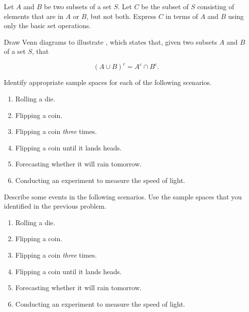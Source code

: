 \documentclass[12pt,reqno]{amsart}
\begin{document}
\bigskip

\prob Let $A$ and $B$ be two subsets of a set $S$. Let $C$ be the subset of $S$ consisting of elements that are in $A$ or $B$, but not both. Express $C$ in terms of $A$ and $B$ using only the basic set operations.
\vspace{2in}

















\prob Draw Venn diagrams to illustrate , which states that, given two subsets $A$ and $B$ of a set $S$, that

	\[(A\cup B)^c = A^c \cap B^c.\]
\vspace{2in}












\prob Identify appropriate sample spaces for each of the following scenarios.

\medskip
\begin{enumerate}
\item Rolling a die.\vfill
\item Flipping a coin.\vfill
\item Flipping a coin \textit{three} times.\vfill
\item Flipping a coin until it lands heads.\vfill
\item Forecasting whether it will rain tomorrow.\vfill
\item Conducting an experiment to measure the speed of light.\vfill
\end{enumerate}











\newpage
\prob Describe some events in the following scenarios. Use the sample spaces that you identified in the previous problem.

\medskip
\begin{enumerate}
\item Rolling a die.\vfill
\item Flipping a coin.\vfill
\item Flipping a coin \textit{three} times.\vfill
\item Flipping a coin until it lands heads.\vfill
\item Forecasting whether it will rain tomorrow.\vfill
\item Conducting an experiment to measure the speed of light.\vfill
\end{enumerate}
\end{document}
